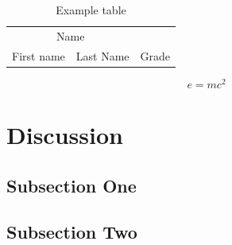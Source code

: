 \documentclass[a4paper,12pt]{article}
\begin{document}
\begin{table}[H]
\caption{Example table}
\centering
\begin{tabular}{llr}
\toprule
\multicolumn{2}{c}{Name} \\
\cmidrule(r){1-2}
First name & Last Name & Grade \\
\midrule
\bottomrule
\end{tabular}
\end{table}


\begin{equation}
\label{eq:emc}
e = mc^2
\end{equation}



\section{Discussion}

\subsection{Subsection One}


\subsection{Subsection Two}


%
{}



 


\end{document}
